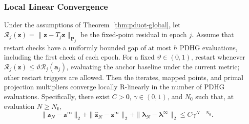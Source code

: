 \subsubsection{Local Linear Convergence}
\label{app:pduot-restart}

\begin{theorem}
\label{thm:pduot-local}
Under the assumptions of Theorem~\ref{thm:pduot-global}, let $\mathcal R_j(\mathbf z)=\|\mathbf z-T_j\mathbf z\|_{\mathbf P_j}$ be the fixed-point residual in epoch $j$.
Assume that restart checks have a uniformly bounded gap of at most $h$ PDHG evaluations, including the first check of each epoch.
For a fixed $\vartheta\in(0,1)$, restart whenever $\mathcal R_j(\mathbf z)\leq\vartheta\mathcal R_j(\mathbf a_j)$, evaluating the anchor baseline under the current metric; other restart triggers are allowed.
Then the iterates, mapped points, and primal projection multipliers converge locally R-linearly in the number of PDHG evaluations.
Specifically, there exist $C>0$, $\gamma\in(0,1)$, and $N_0$ such that, at evaluation $N\geq N_0$,
\begin{equation*}
\|\mathbf z_N-\mathbf z^\infty\|_2+\|\widehat{\mathbf z}_N-\mathbf z^\infty\|_2+\|\boldsymbol\lambda_N-\boldsymbol\lambda^\infty\|_2\leq C\gamma^{N-N_0}.
\end{equation*}
\end{theorem}


